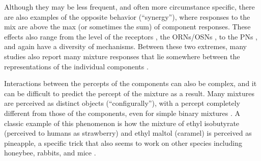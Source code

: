 \documentclass[12pt]{caltech_thesis}
\renewcommand{\cite}{{ }\autocite}
\begin{document}
\begin{refsection}
Although they may be less frequent, and often more circumstance specific, there are also examples of the opposite behavior (``synergy''), where responses to the mix are above the max (or sometimes the sum) of component responses.
These effects also range from the level of the receptors\cite{Kundu2016,DiverseORInteractions,HumanPositiveAllostery}, the ORNs/OSNs\cite{MosquitoORNHumanOdorSynergy,Xu2020}, to the PNs\cite{Das2017,Zocchi2022}, and again have a diversity of mechanisms.
Between these two extremes, many studies also report many mixture responses that lie somewhere between the representations of the individual components\cite{PiriformMixSupp,Campbell2013,Endo2020}.

Interactions between the percepts of the components can also be complex, and it can be difficult to predict the percept of the mixture as a result.
Many mixtures are perceived as distinct objects (``configurally''), with a percept completely different from those of the components, even for simple binary mixtures\cite{Jinks1999,Jinks2001}.
A classic example of this phenomenon is how the mixture of ethyl isobutyrate (perceived to humans as strawberry) and ethyl maltol (caramel) is perceived as pineapple, a specific trick that also seems to work on other species including honeybee, rabbits, and mice\cite{Wycke2020}.


\end{refsection}
\end{document}
